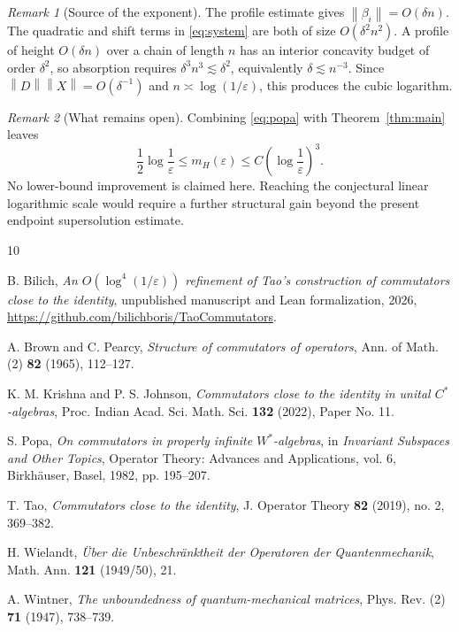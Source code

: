 \documentclass[11pt]{amsart}
\numberwithin{equation}{section}
\theoremstyle{remark}
\newtheorem{remark}[remark]{Remark}
\newcommand{\norm}[1]{\left\lVert #1\right\rVert}
\begin{document}
\begin{remark}[Source of the exponent]
The profile estimate gives $\norm{\beta_i}=O(\delta n)$.  The quadratic and
shift terms in \eqref{eq:system} are both of size $O(\delta^2n^2)$.  A profile
of height $O(\delta n)$ over a chain of length $n$ has an interior concavity
budget of order $\delta^2$, so absorption requires
$\delta^3n^3\lesssim\delta^2$, equivalently $\delta\lesssim n^{-3}$.  Since
$\norm D\norm X=O(\delta^{-1})$ and
$n\asymp\log(1/\varepsilon)$, this produces the cubic logarithm.
\end{remark}

\begin{remark}[What remains open]
Combining \eqref{eq:popa} with Theorem~\ref{thm:main} leaves
\[
 \frac12\log\frac1\varepsilon
 \leq m_H(\varepsilon)
 \leq C\left(\log\frac1\varepsilon\right)^3.
\]
No lower-bound improvement is claimed here.  Reaching the conjectural linear
logarithmic scale would require a further structural gain beyond the present
endpoint supersolution estimate.
\end{remark}

\begin{thebibliography}{10}

B. Bilich,
\emph{An $O(\log^4(1/\varepsilon))$ refinement of Tao's construction of
commutators close to the identity},
unpublished manuscript and Lean formalization, 2026,
\url{https://github.com/bilichboris/TaoCommutators}.

A. Brown and C. Pearcy,
\emph{Structure of commutators of operators},
Ann. of Math. (2) \textbf{82} (1965), 112--127.

K. M. Krishna and P. S. Johnson,
\emph{Commutators close to the identity in unital $C^*$-algebras},
Proc. Indian Acad. Sci. Math. Sci. \textbf{132} (2022), Paper No. 11.

S. Popa,
\emph{On commutators in properly infinite $W^*$-algebras},
in \emph{Invariant Subspaces and Other Topics},
Operator Theory: Advances and Applications, vol. 6,
Birkh\"auser, Basel, 1982, pp. 195--207.

T. Tao,
\emph{Commutators close to the identity},
J. Operator Theory \textbf{82} (2019), no. 2, 369--382.

H. Wielandt,
\emph{\"Uber die Unbeschr\"anktheit der Operatoren der Quantenmechanik},
Math. Ann. \textbf{121} (1949/50), 21.

A. Wintner,
\emph{The unboundedness of quantum-mechanical matrices},
Phys. Rev. (2) \textbf{71} (1947), 738--739.

\end{thebibliography}
\end{document}
